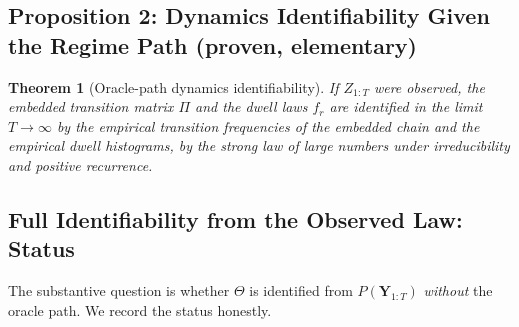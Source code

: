 \documentclass[11pt,a4paper]{article}
\newtheorem{theorem}{Theorem}
\begin{document}
\subsection{Proposition 2: Dynamics Identifiability Given the Regime Path (proven, elementary)}
\begin{theorem}[Oracle-path dynamics identifiability]
If $Z_{1:T}$ were observed, the embedded transition matrix $\Pi$ and the dwell laws $f_r$ are identified in the limit $T \to \infty$ by the empirical transition frequencies of the embedded chain and the empirical dwell histograms, by the strong law of large numbers under irreducibility and positive recurrence. %
\end{theorem}

\subsection{Full Identifiability from the Observed Law: Status}
The substantive question is whether $\Theta$ is identified from $P(\mathbf{Y}_{1:T})$ \emph{without} the oracle path. We record the status honestly. %
\end{document}
